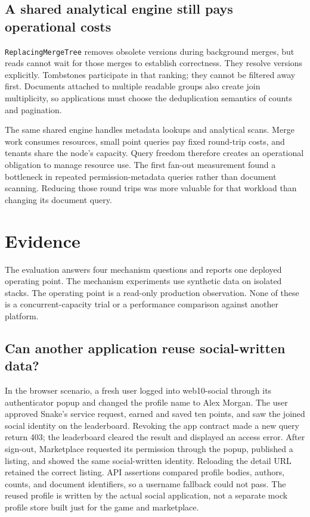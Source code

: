 \documentclass[sigconf, nonacm]{acmart}
\begin{document}
\subsection{A shared analytical engine still pays operational costs}

\texttt{ReplacingMergeTree} removes obsolete versions during background
merges, but reads cannot wait for those merges to establish correctness.
They resolve versions explicitly. Tombstones participate in that ranking;
they cannot be filtered away first. Documents attached to multiple readable
groups also create join multiplicity, so applications must choose the
deduplication semantics of counts and pagination.

The same shared engine handles metadata lookups and analytical scans.
Merge work consumes resources, small point queries pay fixed round-trip
costs, and tenants share the node's capacity. Query freedom therefore
creates an operational obligation to manage resource use. The first
fan-out measurement found a bottleneck in repeated permission-metadata
queries rather than document scanning. Reducing those round trips was
more valuable for that workload than changing its document query.

\section{Evidence}
\label{sec:evaluation}

The evaluation answers four mechanism questions and reports one deployed
operating point. The mechanism experiments use synthetic data on isolated
stacks. The operating point is a read-only production observation. None
of these is a concurrent-capacity trial or a performance comparison
against another platform.

\subsection{Can another application reuse social-written data?}
\label{sec:ev-interop}

In the browser scenario, a fresh user logged into web10-social through
its authenticator popup and changed the profile name to Alex Morgan.
The user approved Snake's service request, earned and saved ten points,
and saw the joined social identity on the leaderboard. Revoking the app
contract made a new query return 403; the leaderboard cleared the result
and displayed an access error. After sign-out, Marketplace requested
its permission through the popup, published a listing, and showed the
same social-written identity. Reloading the detail URL retained the
correct listing. API assertions compared profile bodies, authors, counts,
and document identifiers, so a username fallback could not pass.
The reused profile is written by the actual social application, not a
separate mock profile store built just for the game and marketplace.
\end{document}
